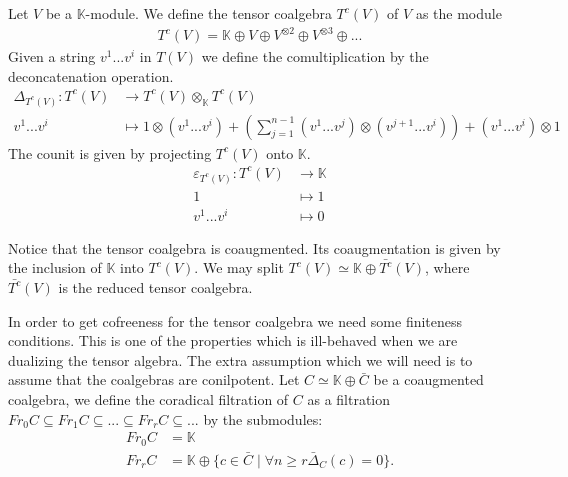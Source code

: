 \documentclass[../thesis.tex]{subfiles}
\begin{document}
            \begin{definition}
                Let $V$ be a $\mathbb{K}$-module. We define the tensor coalgebra $T^c(V)$ of $V$ as the module
                \begin{align*}
                    T^c(V) = \mathbb{K}\oplus V\oplus V^{\otimes 2}\oplus V^{\otimes 3}\oplus ...
                \end{align*}
                Given a string $v^1...v^i$ in $T(V)$ we define the comultiplication by the deconcatenation operation.
                \begin{align*}
                    \Delta_{T^c(V)}:T^c(V) & \rightarrow T^c(V)\otimes_{\mathbb{K}}T^c(V) \\
                    v^1...v^i & \mapsto 1\otimes(v^1...v^i) + (\sum_{j=1}^{n-1} (v^1...v^{j})\otimes(v^{j+1}...v^i)) + (v^1...v^i)\otimes 1
                \end{align*}
                The counit is given by projecting $T^c(V)$ onto $\mathbb{K}$.
                \begin{align*}
                    \varepsilon_{T^c(V)} : T^c(V) & \rightarrow \mathbb{K} \\
                    1 & \mapsto 1 \\
                    v^1...v^i & \mapsto 0
                \end{align*}
            \end{definition}

            Notice that the tensor coalgebra is coaugmented. Its coaugmentation is given by the inclusion of $\mathbb{K}$ into $T^c(V)$. We may split $T^c(V) \simeq \mathbb{K}\oplus \bar{T^c}(V)$, where $\bar{T^c}(V)$ is the reduced tensor coalgebra.

            In order to get cofreeness for the tensor coalgebra we need some finiteness conditions. This is one of the properties which is ill-behaved when we are dualizing the tensor algebra. The extra assumption which we will need is to assume that the coalgebras are conilpotent. Let $C \simeq \mathbb{K} \oplus \bar{C}$ be a coaugmented coalgebra, we define the coradical filtration of $C$ as a filtration $Fr_0C \subseteq Fr_1C \subseteq ... \subseteq Fr_rC \subseteq ...$ by the submodules:
            \begin{align*}
                Fr_0C & = \mathbb{K} \\
                Fr_rC & = \mathbb{K} \oplus \{c\in\bar{C}\mid \forall n\geq r \bar{\Delta}_C(c) = 0\}.
            \end{align*}
\end{document}
